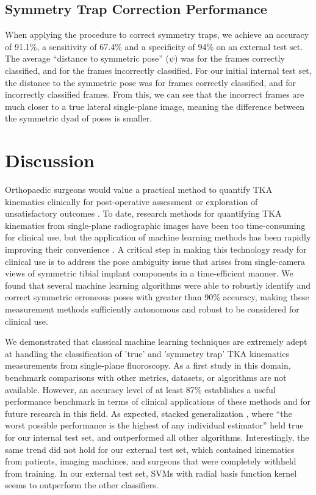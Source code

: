 \subsection{Symmetry Trap Correction Performance}
When applying the procedure to correct symmetry traps, we achieve an accuracy of 91.1\%, a sensitivity of 67.4\% and a specificity of 94\% on an external test set.
The average “distance to symmetric pose” ($\psi$) was  for the frames correctly classified, and  for the frames incorrectly classified.
For our initial internal test set, the distance to the symmetric pose was  for frames correctly classified, and  for incorrectly classified frames.
From this, we can see that the incorrect frames are much closer to a true lateral single-plane image, meaning the difference between the symmetric dyad of poses is smaller.

\section{Discussion}
Orthopaedic surgeons would value a practical method to quantify TKA kinematics clinically for post-operative assessment or exploration of unsatisfactory outcomes \cite{banksWhatPostoperativeOutcome2017}.
To date, research methods for quantifying TKA kinematics from single-plane radiographic images have been too time-consuming for clinical use, but the application of machine learning methods has been rapidly improving their convenience \cite{jensenJointTrackMachine2023}.
A critical step in making this technology ready for clinical use is to address the pose ambiguity issue that arises from single-camera views of symmetric tibial implant components in a time-efficient manner.
We found that several machine learning algorithms were able to robustly identify and correct symmetric erroneous poses with greater than 90\% accuracy, making these measurement methods sufficiently autonomous and robust to be considered for clinical use.


We demonstrated that classical machine learning techniques are extremely adept at handling the classification of 'true' and 'symmetry trap' TKA kinematics measurements from single-plane fluoroscopy.
As a first study in this domain, benchmark comparisons with other metrics, datasets, or algorithms are not available.
However, an accuracy level of at least 87\% establishes a useful performance benchmark in terms of clinical applications of these methods and for future research in this field.
As expected, stacked generalization \cite{wolpertStackedGeneralization1992,smythLinearlyCombiningDensity1999}, where “the worst possible performance is the highest of any individual estimator” held true for our internal test set, and outperformed all other algorithms.
Interestingly, the same trend did not hold for our external test set, which contained kinematics from patients, imaging machines, and surgeons that were completely withheld from training.
In our external test set, SVMs with radial basis function kernel seems to outperform the other classifiers.


